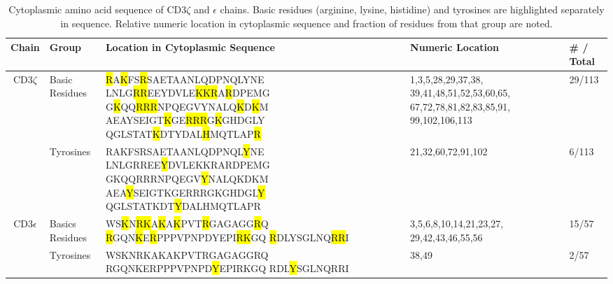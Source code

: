 \documentclass[../../AdvancementSummary.tex]{subfiles}
\begin{document}
\begin{table}[H]
    \caption{Cytoplasmic amino acid sequence of CD3$\zeta$ and $\epsilon$ chains.  Basic residues (arginine, lysine, histidine) and tyrosines are highlighted separately in sequence.  Relative numeric location in cytoplasmic sequence and fraction of residues from that group are noted. \label{table: BasicsYLocation}}
    \begin{center}
    \begin{tabular}{|c|p{2cm}|p{6cm}|p{3.5cm}|p{1.6cm}|}
    	\hline
	Chain 		& 		Group			&		Location in Cytoplasmic Sequence	&	Numeric Location		&		\# / Total	\\
	\hline
	
	
    	\multicolumn{1}{|c|}{\multirow{2}[0]{*}{CD3$\zeta$}} 	&  	Basic Residues				& 	
	
	\hl{R}A\hl{K}FS\hl{R}SAETAANLQDPNQLYNE
	LNLG\hl{RR}EEYDVLE\hl{KKR}A\hl{R}DPEMG
	G\hl{K}QQ\hl{RRR}NPQEGVYNALQ\hl{K}D\hl{K}M
	AEAYSEIGT\hl{K}GE\hl{RRR}G\hl{K}GHDGLY
	QGLSTAT\hl{K}DTYDAL\hl{H}MQTLAP\hl{R}			& 	
	
	1,3,5,28,29,37,38,
	39,41,48,51,52,53,60,65,
	67,72,78,81,82,83,85,91,
	99,102,106,113 		& 	
	
	29/113	\\
	\cline{2-5}
	
	
	
		&	 Tyrosines									&	
	
	RAKFSRSAETAANLQDPNQL\hl{Y}NE
	LNLGRREE\hl{Y}DVLEKKRARDPEMG
	GKQQRRRNPQEGV\hl{Y}NALQKDKM
	AEA\hl{Y}SEIGTKGERRRGKGHDGL\hl{Y}
	QGLSTATKDT\hl{Y}DALHMQTLAPR 				& 	
	
	21,32,60,72,91,102											&	
	
	6/113			\\
	\hline
	
	
	\multicolumn{1}{|c|}{\multirow{2}{*}{CD3$\epsilon$}}	&	 Basics Residues		&
	
	WS\hl{K}N\hl{RK}A\hl{K}A\hl{K}PVT\hl{R}GAGAGG\hl{R}Q
	\hl{R}GQN\hl{K}E\hl{R}PPPVPNPDYEPI\hl{RK}GQ
	\hl{R}DLYSGLNQ\hl{RR}I					& 	
	
	3,5,6,8,10,14,21,23,27,
	29,42,43,46,55,56	&		
	
	15/57	\\
	\cline{2-5}
	
	
		&		 Tyrosines				& 	
	
	WSKNRKAKAKPVTRGAGAGGRQ
	RGQNKERPPPVPNPD\hl{Y}EPIRKGQ
	RDL\hl{Y}SGLNQRRI			&
	
	 38,49		& 		
	 
	 2/57			\\
	\hline
    \end{tabular}
    \end{center}
\end{table}
\end{document}
